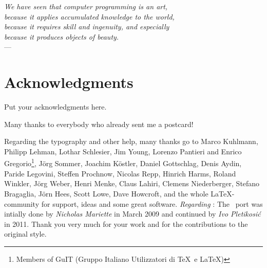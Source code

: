 
\begin{flushright}{\slshape
        We have seen that computer programming is an art, \\
        because it applies accumulated knowledge to the world, \\
        because it requires skill and ingenuity, and especially \\
        because it produces objects of beauty.} \\ \medskip
    ---  \citep{knuth:1974}
\end{flushright}
\bigskip
\begingroup
\let\clearpage\relax
\let\cleardoublepage\relax
\let\cleardoublepage\relax
\chapter*{Acknowledgments}
Put your acknowledgments here.

Many thanks to everybody who already sent me a postcard!

Regarding the typography and other help, many thanks go to Marco
Kuhlmann, Philipp Lehman, Lothar Schlesier, Jim Young, Lorenzo
Pantieri and Enrico Gregorio\footnote{Members of GuIT (Gruppo
    Italiano Utilizzatori di \TeX\ e \LaTeX )}, J\"org Sommer,
Joachim K\"ostler, Daniel Gottschlag, Denis Aydin, Paride
Legovini, Steffen Prochnow, Nicolas Repp, Hinrich Harms,
Roland Winkler, Jörg Weber, Henri Menke, Claus Lahiri,
Clemens Niederberger, Stefano Bragaglia, Jörn Hees,
Scott Lowe, Dave Howcroft,
and the whole \LaTeX-community for support, ideas and
some great software.
\bigskip
\noindent\emph{Regarding \mLyX}: The \mLyX\ port was intially done by
\emph{Nicholas Mariette} in March 2009 and continued by
\emph{Ivo Pletikosi\'c} in 2011. Thank you very much for your
work and for the contributions to the original style.
\endgroup
